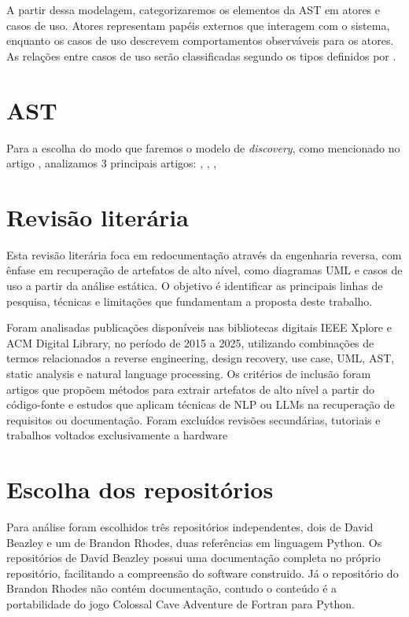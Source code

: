 \documentclass[12pt,a4paper]{article}
\begin{document}
A partir dessa modelagem, categorizaremos os elementos da AST em atores e casos de uso. Atores representam papéis externos que interagem com o sistema, enquanto os casos de uso descrevem comportamentos observáveis para os atores. As relações entre casos de uso serão classificadas segundo os tipos definidos por \textcite{booch1999unified}. 


\section{AST}
Para a escolha do modo que faremos o modelo de \textit{discovery}, como mencionado no artigo \textcite{Bruneliere2010MoDisco}, analizamos 3 principais artigos: \textcite{feng2020codebert}, \textcite{feng2020codebert}, \textcite{ngo2023exploring}, \textcite{} 
\section{Revisão literária}
Esta revisão literária foca em redocumentação através da engenharia reversa, com ênfase em recuperação de artefatos de alto nível, como diagramas UML e casos de uso a partir da análise estática. O objetivo é identificar as principais linhas de pesquisa, técnicas e limitações que fundamentam a proposta deste trabalho.

Foram analisadas publicações disponíveis nas bibliotecas digitais IEEE Xplore e ACM Digital Library, no período de 2015 a 2025, utilizando combinações de termos relacionados a reverse engineering, design recovery, use case, UML, AST, static analysis e natural language processing. Os critérios de inclusão foram artigos que propõem métodos para extrair artefatos de alto nível a partir do código-fonte e estudos que aplicam técnicas de NLP ou LLMs na recuperação de requisitos ou documentação. Foram excluídos revisões secundárias, tutoriais e trabalhos voltados exclusivamente a hardware

\section{Escolha dos repositórios}
Para análise foram escolhidos três repositórios independentes, dois de David Beazley e um de Brandon Rhodes, duas referências em linguagem Python. Os repositórios de David Beazley possui uma documentação completa no próprio repositório, facilitando a compreensão do software construido. Já o repositório do Brandon Rhodes não contém documentação, contudo o conteúdo é a portabilidade do jogo Colossal Cave Adventure de Fortran para Python.
\end{document}
